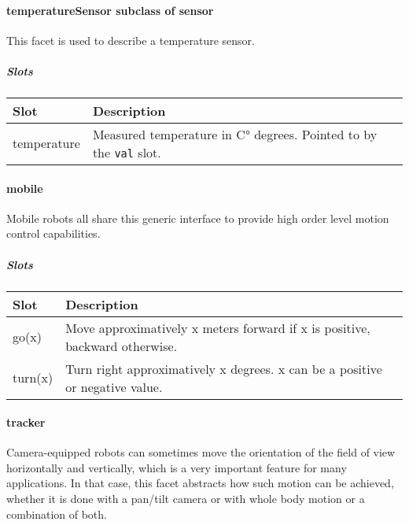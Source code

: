 \documentclass[a4paper]{article}
\begin{document}
\paragraph{ temperatureSensor  \textmd{subclass of sensor}}


This facet is used to describe a temperature sensor.

\subparagraph{Slots}

\begin{flushleft}
\tablehead{}
\begin{supertabular}{|m{2.98cm}|m{12.31cm}|}
\hline
\sffamily\bfseries Slot &
\sffamily\bfseries Description\\\hline
temperature &
\sffamily Measured temperature in C° degrees.
Pointed to by the \texttt{val} slot.\\\hline
\end{supertabular}
\end{flushleft}
\paragraph{mobile}


Mobile robots all share this generic interface to provide high order
level motion control capabilities.

\subparagraph{Slots}

\begin{flushleft}
\tablehead{}
\begin{supertabular}{|m{3.293cm}|m{11.997cm}|}
\hline
\sffamily\bfseries Slot &
\sffamily\bfseries Description\\\hline
go(x) &
\sffamily Move approximatively x meters forward
if x is positive, backward otherwise.\\\hline
turn(x) &
\sffamily Turn right approximatively x degrees.
x can be a positive or negative value.\\\hline
\end{supertabular}
\end{flushleft}
\paragraph{tracker}


Camera-equipped robots can sometimes move the orientation of the field
of view horizontally and vertically, which is a very important feature
for many applications. In that case, this facet abstracts how such
motion can be achieved, whether it is done with a pan/tilt camera or
with whole body motion or a combination of both.
\end{document}
